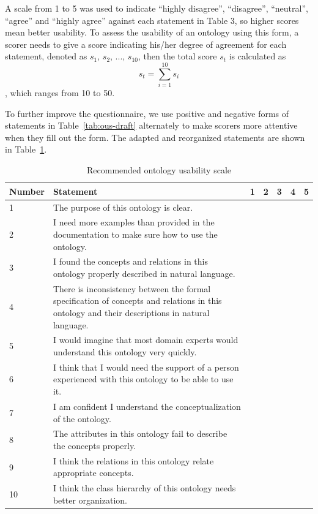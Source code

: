 A scale from 1 to 5 was used to indicate ``highly
disagree'', ``disagree'', ``neutral'', ``agree'' and ``highly
agree'' against each statement in Table 3, so higher
scores mean better usability. To assess the usability
of an ontology using this form, a scorer needs to give
a score indicating his/her degree of agreement for
each statement, denoted as $s_1$, $s_2$, ..., $s_10$, then the
total score $s_t$ is calculated as
\begin{equation}
\label{eq1}
s_t = \sum_{i=1}^{10}s_i
\end{equation}
, which ranges from 10 to 50.

To further improve the questionnaire, we use positive
and negative forms of statements in Table~\ref{tab:ous-draft} alternately
to make scorers more attentive when they
fill out the form. The adapted and reorganized statements
are shown in Table~\ref{tab:ous}.
\begin{table}
	\centering
	\caption{Recommended ontology usability scale}
	\label{tab:ous}
		\begin{tabular}{|p{}|p{}|l|l|l|l|l|}
			\hline Number & Statement & 1 & 2 & 3 & 4 & 5 \\ 
			\hline 1 & The purpose of this ontology is clear. &  &  &  &  &  \\ 
			\hline 2 & I need more examples than provided in the documentation to make sure how to use the ontology. &  &  &  &  &  \\ 
			\hline 3 & I found the concepts and relations in this ontology properly described in natural language. &  &  &  &  &  \\ 
			\hline 4 & There is inconsistency between the formal specification of concepts and relations in this ontology and their descriptions
			in natural language. &  &  &  &  &  \\ 
			\hline 5 & I would imagine that most domain experts would understand this ontology very quickly. &  &  &  &  &  \\ 
			\hline 6 & I think that I would need the support of a person experienced with this ontology to be able to use it. &  &  &  &  &  \\ 
			\hline 7 & I am confident I understand the conceptualization of the ontology. &  &  &  &  &  \\ 
			\hline 8 & The attributes in this ontology fail to describe the concepts properly. &  &  &  &  &  \\ 
			\hline 9 & I think the relations in this ontology relate appropriate concepts. &  &  &  &  &  \\ 
			\hline 10 & I think the class hierarchy of this ontology needs better organization. &  &  &  &  &  \\ 
			\hline 
		\end{tabular} 
\end{table}

